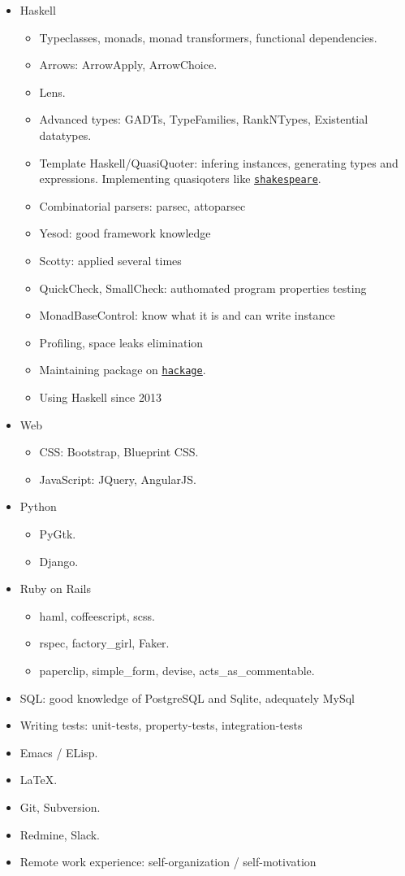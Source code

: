 \documentclass[11pt,a4paper,sans]{moderncv}
\newcommand*{\nlink}[2]{\textcolor{blue}{\texttt{\underline{\href{#1}{#2}}}}}
\begin{document}
\begin{itemize}
\item Haskell
  \begin{itemize}
  \item Typeclasses, monads, monad transformers, functional dependencies.
  \item Arrows: ArrowApply, ArrowChoice.
  \item Lens.
  \item Advanced types: GADTs, TypeFamilies, RankNTypes, Existential datatypes.
  \item Template Haskell/QuasiQuoter: infering instances, generating
    types and expressions. Implementing quasiqoters like
    \nlink{http://hackage.haskell.org/package/shakespeare}{shakespeare}.
  \item Combinatorial parsers: parsec, attoparsec
  \item Yesod: good framework knowledge
  \item Scotty: applied several times
  \item QuickCheck, SmallCheck: authomated program properties testing
  \item MonadBaseControl: know what it is and can write instance
  \item Profiling, space leaks elimination
  \item Maintaining package on
    \nlink{http://hackage.haskell.org/user/AlekseyUymanov}{hackage}.
  \item Using Haskell since 2013
  \end{itemize}
\item Web
  \begin{itemize}
  \item CSS: Bootstrap, Blueprint CSS.
  \item JavaScript: JQuery, AngularJS.
  \end{itemize}
\item Python
  \begin{itemize}
  \item PyGtk.
  \item Django.
  \end{itemize}
\item Ruby on Rails
  \begin{itemize}
  \item haml, coffeescript, scss.
  \item rspec, factory\_girl, Faker.
  \item paperclip, simple\_form, devise, acts\_as\_commentable.
  \end{itemize}
\item SQL: good knowledge of PostgreSQL and Sqlite, adequately MySql
\item Writing tests: unit-tests, property-tests, integration-tests
\item Emacs / ELisp.
\item \LaTeX.
\item Git, Subversion.
\item Redmine, Slack.
\item Remote work experience: self-organization / self-motivation
\end{itemize}
\end{document}
